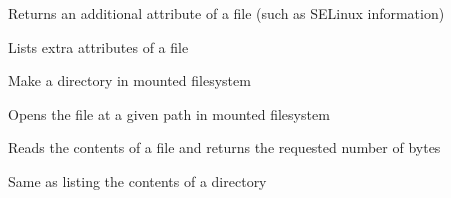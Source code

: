 \documentclass[letterpaper,12pt,openany,oneside]{sphinxmanual}
\begin{document}
\begin{fulllineitems}
\begin{fulllineitems}
\label{File_System:webStegFS.File_System.memfuse.MemFS.getxattr}
Returns an additional attribute of a file (such as SELinux information)

\end{fulllineitems}


\begin{fulllineitems}
\label{File_System:webStegFS.File_System.memfuse.MemFS.listxattr}
Lists extra attributes of a file

\end{fulllineitems}


\begin{fulllineitems}
\label{File_System:webStegFS.File_System.memfuse.MemFS.mkdir}
Make a directory in mounted filesystem

\end{fulllineitems}


\begin{fulllineitems}
\label{File_System:webStegFS.File_System.memfuse.MemFS.open}
Opens the file at a given path in mounted filesystem

\end{fulllineitems}


\begin{fulllineitems}
\label{File_System:webStegFS.File_System.memfuse.MemFS.read}
Reads the contents of a file and returns the requested number of bytes

\end{fulllineitems}


\begin{fulllineitems}
\label{File_System:webStegFS.File_System.memfuse.MemFS.readdir}
Same as listing the contents of a directory


\end{fulllineitems}
\end{fulllineitems}
\end{document}

